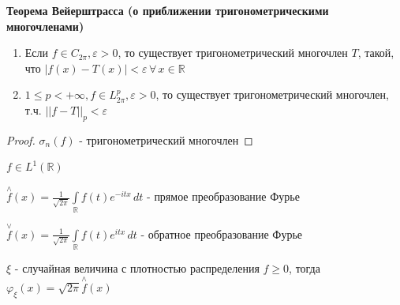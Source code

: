 \begin{theorem}
    \textbf{Теорема Вейерштрасса (о приближении тригонометрическими многочленами)}

    \begin{enumerate}
        \item {
            Если $f \in C_{2\pi}, \varepsilon > 0$, то существует тригонометрический многочлен $T$, такой, что $|f(x) - T(x)| < \varepsilon \, \forall \, x \in \mathbb{R}$
        }
        \item {
            $1 \leqslant p < +\infty, f \in L_{2\pi}^p, \varepsilon > 0$, то существует тригонометрический многочлен, т.ч. $||f - T||_p < \varepsilon$
        }
    \end{enumerate}
\end{theorem}

\begin{proof}
    $\sigma_n (f)$ - тригонометрический многочлен
\end{proof}


\begin{definition}
    $f \in L^1 (\mathbb{R})$

    $\overset{\wedge}{f} (x) = \frac{1}{\sqrt{2\pi}} \int\limits_{\mathbb{R}} f(t) e^{-itx} \, dt$ - прямое преобразование Фурье
    
    $\overset{\vee}{f} (x) = \frac{1}{\sqrt{2\pi}} \int\limits_{\mathbb{R}} f(t) e^{itx} \, dt$ - обратное преобразование Фурье

\end{definition}

\begin{remark}
    $\xi$ - случайная величина с плотностью распределения $f \geqslant 0$, тогда $\varphi_\xi (x) = \sqrt{2\pi} \overset{\wedge}{f} (x) $
\end{remark}

